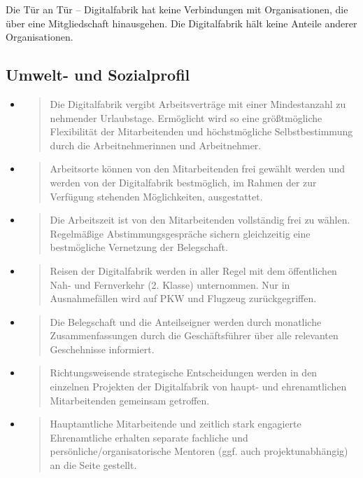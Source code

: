 \documentclass[12pt, a4paper]{article} %
\begin{document}
Die Tür an Tür – Digitalfabrik hat keine Verbindungen mit
Organisationen, die über eine Mitgliedschaft hinausgehen. Die
Digitalfabrik hält keine Anteile anderer Organisationen.

\hypertarget{umwelt--und-sozialprofil}{%
\subsection{Umwelt- und
Sozialprofil}\label{umwelt--und-sozialprofil}}

\begin{itemize}
\item
  \begin{quote}
  Die Digitalfabrik vergibt Arbeitsverträge mit einer Mindestanzahl zu
  nehmender Urlaubstage. Ermöglicht wird so eine größtmögliche
  Flexibilität der Mitarbeitenden und höchstmögliche Selbstbestimmung
  durch die Arbeitnehmerinnen und Arbeitnehmer.
  \end{quote}
\item
  \begin{quote}
  Arbeitsorte können von den Mitarbeitenden frei gewählt werden und
  werden von der Digitalfabrik bestmöglich, im Rahmen der zur Verfügung
  stehenden Möglichkeiten, ausgestattet.
  \end{quote}
\item
  \begin{quote}
  Die Arbeitszeit ist von den Mitarbeitenden vollständig frei zu wählen.
  Regelmäßige Abstimmungsgespräche sichern gleichzeitig eine
  bestmögliche Vernetzung der Belegschaft.
  \end{quote}
\item
  \begin{quote}
  Reisen der Digitalfabrik werden in aller Regel mit dem öffentlichen
  Nah- und Fernverkehr (2. Klasse) unternommen. Nur in Ausnahmefällen
  wird auf PKW und Flugzeug zurückgegriffen.
  \end{quote}
\item
  \begin{quote}
  Die Belegschaft und die Anteilseigner werden durch monatliche
  Zusammenfassungen durch die Geschäftsführer über alle relevanten
  Geschehnisse informiert.
  \end{quote}
\item
  \begin{quote}
  Richtungsweisende strategische Entscheidungen werden in den einzelnen
  Projekten der Digitalfabrik von haupt- und ehrenamtlichen
  Mitarbeitenden gemeinsam getroffen.
  \end{quote}
\item
  \begin{quote}
  Hauptamtliche Mitarbeitende und zeitlich stark engagierte
  Ehrenamtliche erhalten separate fachliche und
  persönliche/organisatorische Mentoren (ggf. auch projektunabhängig) an
  die Seite gestellt.
  \end{quote}
\end{itemize}
\end{document}
